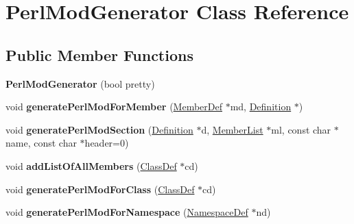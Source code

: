 \hypertarget{class_perl_mod_generator}{}\section{Perl\+Mod\+Generator Class Reference}
\label{class_perl_mod_generator}
\subsection*{Public Member Functions}
\begin{DoxyCompactItemize}
\item 
\mbox{\label{class_perl_mod_generator_a7473195622dcb57930bbd08c88dd6504}} 
{\bfseries Perl\+Mod\+Generator} (bool pretty)
\item 
\mbox{\label{class_perl_mod_generator_a3d4ede2123b22d069fceb46ced7849fc}} 
void {\bfseries generate\+Perl\+Mod\+For\+Member} (\mbox{\hyperlink{class_member_def}{Member\+Def}} $\ast$md, \mbox{\hyperlink{class_definition}{Definition}} $\ast$)
\item 
\mbox{\label{class_perl_mod_generator_ae6915400c241f3dc0727f428e16220dc}} 
void {\bfseries generate\+Perl\+Mod\+Section} (\mbox{\hyperlink{class_definition}{Definition}} $\ast$d, \mbox{\hyperlink{class_member_list}{Member\+List}} $\ast$ml, const char $\ast$name, const char $\ast$header=0)
\item 
\mbox{\label{class_perl_mod_generator_abd4c61f5193f086693ff35917dff5c31}} 
void {\bfseries add\+List\+Of\+All\+Members} (\mbox{\hyperlink{class_class_def}{Class\+Def}} $\ast$cd)
\item 
\mbox{\label{class_perl_mod_generator_a1540264b33a68abcf8ec9964cc396fbf}} 
void {\bfseries generate\+Perl\+Mod\+For\+Class} (\mbox{\hyperlink{class_class_def}{Class\+Def}} $\ast$cd)
\item 
\mbox{\label{class_perl_mod_generator_aaca0167b0044699d857a1ee642072485}} 
void {\bfseries generate\+Perl\+Mod\+For\+Namespace} (\mbox{\hyperlink{class_namespace_def}{Namespace\+Def}} $\ast$nd)
\item 
\mbox{\label{class_perl_mod_generator_a306916cfc7ba295e17252c610f1c8c93}} 

\end{DoxyCompactItemize}
